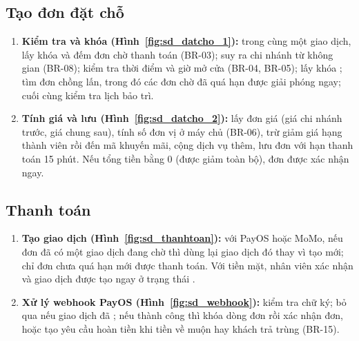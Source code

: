 \subsection{Tạo đơn đặt chỗ}
\begin{enumerate}
    \item \textbf{Kiểm tra và khóa (Hình~\ref{fig:sd_datcho_1}):} trong cùng một giao dịch,  lấy khóa  và đếm đơn chờ thanh toán (BR-03); suy ra chi nhánh từ không gian (BR-08); kiểm tra thời điểm và giờ mở cửa (BR-04, BR-05); lấy khóa ; tìm đơn chồng lấn, trong đó các đơn chờ đã quá hạn được giải phóng ngay; cuối cùng kiểm tra lịch bảo trì.
    \item \textbf{Tính giá và lưu (Hình~\ref{fig:sd_datcho_2}):} lấy đơn giá (giá chi nhánh trước, giá chung sau), tính số đơn vị ở máy chủ (BR-06), trừ giảm giá hạng thành viên rồi đến mã khuyến mãi, cộng dịch vụ thêm, lưu đơn  với hạn thanh toán 15 phút. Nếu tổng tiền bằng 0 (được giảm toàn bộ), đơn được xác nhận ngay.
\end{enumerate}


\subsection{Thanh toán}
\begin{enumerate}
    \item \textbf{Tạo giao dịch (Hình~\ref{fig:sd_thanhtoan}):} với PayOS hoặc MoMo, nếu đơn đã có một giao dịch đang chờ thì dùng lại giao dịch đó thay vì tạo mới; chỉ đơn  chưa quá hạn mới được thanh toán. Với tiền mặt, nhân viên xác nhận và giao dịch được tạo ngay ở trạng thái .
    \item \textbf{Xử lý webhook PayOS (Hình~\ref{fig:sd_webhook}):} kiểm tra chữ ký; bỏ qua nếu giao dịch đã ; nếu thành công thì khóa dòng đơn rồi xác nhận đơn, hoặc tạo yêu cầu hoàn tiền khi tiền về muộn hay khách trả trùng (BR-15).
\end{enumerate}


